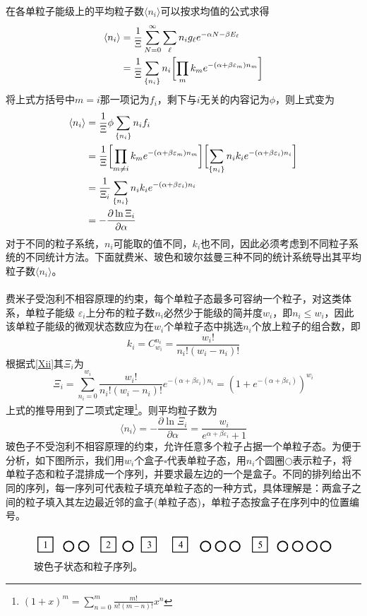\documentclass[UTF8,oneside,openany]{ctexbook}
\newcommand\aver[1]{\langle#1\rangle}
\begin{document}
在各单粒子能级上的平均粒子数$\aver{n_i}$可以按求均值的公式求得
\begin{align}
\aver{n_i}&=\frac{1}{\Xi}\sum_{N=0}^{\infty}\sum_{\ell}n_ig_{\ell}e^{-\alpha N-\beta E_{\ell}}\notag\\
&=\frac{1}{\Xi}\sum_{\{n_i\}}n_i\biggl[\prod_{m}k_me^{-(\alpha+\beta\varepsilon_m)n_m}\biggr]
\end{align}
将上式方括号中$m=i$那一项记为$f_i$，剩下与$i$无关的内容记为$\phi$，则上式变为
\begin{align}
\aver{n_i}&=\frac{1}{\Xi}\phi\sum_{\{n_i\}}n_if_i\notag\\
&=\frac{1}{\Xi}\biggl[\prod_{m\neq i}k_me^{-(\alpha+\beta\varepsilon_m)n_m}\biggr]\biggl[\sum_{\{n_i\}}n_ik_ie^{-(\alpha+\beta\varepsilon_i)n_i}\biggr]\notag\\
&=\frac{1}{\Xi_i}\sum_{\{n_i\}}n_ik_ie^{-(\alpha+\beta\varepsilon_i)n_i}\notag\\
&=-\frac{\partial\ln\Xi_i}{\partial\alpha}
\end{align}
对于不同的粒子系统，$n_i$可能取的值不同，$k_i$也不同，因此必须考虑到不同粒子系统的不同统计方法。下面就费米、玻色和玻尔兹曼三种不同的统计系统导出其平均粒子数$\aver{n_i}$。
\\
\\
费米子受泡利不相容原理的约束，每个单粒子态最多可容纳一个粒子，对这类体系，单粒子能级
$\varepsilon_i$上分布的粒子数$n_i$必然少于能级的简并度$w_i$，即$n_i\leq w_i$，因此该单粒子能级的微观状态数应为在$w_i$个单粒子态中挑选$n_i$个放上粒子的组合数，即
\begin{equation}
k_i=C_{w_i}^{n_i}=\frac{w_i!}{n_i!(w_i-n_i)!}
\end{equation}
根据式\ref{Xii}其$\Xi_i$为
\begin{equation}
\Xi_i=\sum_{n_i=0}^{w_i}\frac{w_i!}{n_i!(w_i-n_i)!}e^{-(\alpha+\beta\varepsilon_i)n_i}=(1+e^{-(\alpha+\beta\varepsilon_i)})^{w_i}
\end{equation}
上式的推导用到了二项式定理\footnote{$(1+x)^m=\sum_{n=0}^{m}\frac{m!}{n!(m-n)!}x^n$}。则平均粒子数为
\begin{equation}
\aver{n_i}=-\frac{\partial\ln\Xi_i}{\partial\alpha}=\frac{w_i}{e^{\alpha+\beta\varepsilon_i}+1}
\end{equation}
玻色子不受泡利不相容原理的约束，允许任意多个粒子占据一个单粒子态。为便于分析，如下图所示，我们用$w_i$个盒子$\square$代表单粒子态，用$n_i$个圆圈$\bigcirc$表示粒子，将单粒子态和粒子混排成一个序列，并要求最左边的一个是盒子。不同的排列给出不同的序列，每一序列可代表粒子填充单粒子态的一种方式，具体理解是：两盒子之间的粒子填入其左边最近邻的盒子(单粒子态)，单粒子态按盒子在序列中的位置编号。
\begin{figure}[ht]
	\centering
	\includegraphics[scale=0.3]{boson.png}
	\caption{玻色子状态和粒子序列。}
\end{figure}
\end{document}
